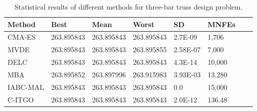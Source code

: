 
\begin{table*}[tp]
    \tiny
\begin{center}

\begin{tabular}{ P{2.0cm} P{2.0cm} P{2.0cm} P{2.0cm} P{2.0cm} P{2.0cm} P{2.0cm} P{2.0cm}  }
\hline
\textbf{Method} & \textbf{Best} & \textbf{Mean} & \textbf{Worst} & \textbf{SD} & \textbf{MNFEs} \\
\hline

CMA-ES & 263.895843 & 263.895843 & 263.895843 & 2.7E-09 & 1,706 \\
MVDE & 263.895843 & 263.895843 & 263.895855 & 2.58E-07 & 7,000 \\
DELC & 263.895843 & 263.895843 & 263.895843 & 4.3E-14 & 10,000 \\
MBA & 263.895852 & 263.897996 & 263.915983 & 3.93E-03 & 13,280 \\
IABC-MAL & 263.895843 & 263.895843 & 263.895843 & 0.0 & 15,000 \\
C-ITGO & 263.895843 & 263.895843 & 263.895843 & 2.0E-12 & 136.48 \\


\hline
\end{tabular}
\end{center}

\caption{ Statistical results of different methods for three-bar truss design problem. \\[1em]}
\label{tab:TB}
\end{table*}

